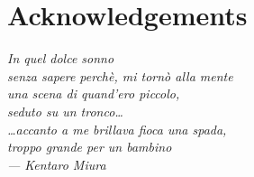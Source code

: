 

\chapter*{Acknowledgements}

\bigskip
\bigskip

\begin{flushright}
\itshape
In quel dolce sonno\\
senza sapere perchè, mi tornò alla mente \\
una scena di quand'ero piccolo, \\
seduto su un tronco\dots \\
\dots accanto a me brillava fioca una spada,\\ 
troppo grande per un bambino\\
\medskip
--- Kentaro Miura
\end{flushright}

\bigskip
\bigskip


